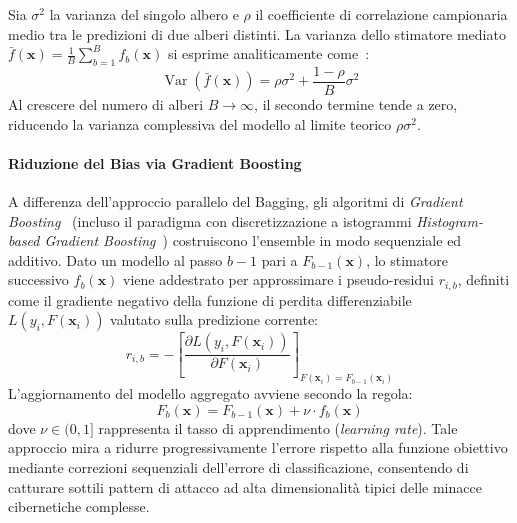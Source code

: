 Sia $\sigma^2$ la varianza del singolo albero e $\rho$ il coefficiente di correlazione campionaria medio tra le predizioni di due alberi distinti. La varianza dello stimatore mediato $\bar{f}(\mathbf{x}) = \frac{1}{B} \sum_{b=1}^B f_b(\mathbf{x})$ si esprime analiticamente come~\cite{hastie2009}:
\begin{equation}
    \operatorname{Var}(\bar{f}(\mathbf{x})) = \rho \sigma^2 + \frac{1 - \rho}{B} \sigma^2
\end{equation}
Al crescere del numero di alberi $B \to \infty$, il secondo termine tende a zero, riducendo la varianza complessiva del modello al limite teorico $\rho \sigma^2$.

\paragraph{Riduzione del Bias via Gradient Boosting}
A differenza dell'approccio parallelo del Bagging, gli algoritmi di \textit{Gradient Boosting}~\cite{friedman2001} (incluso il paradigma con discretizzazione a istogrammi \textit{Histogram-based Gradient Boosting}~\cite{ke2017}) costruiscono l'ensemble in modo sequenziale ed additivo. Dato un modello al passo $b-1$ pari a $F_{b-1}(\mathbf{x})$, lo stimatore successivo $f_b(\mathbf{x})$ viene addestrato per approssimare i pseudo-residui $r_{i,b}$, definiti come il gradiente negativo della funzione di perdita differenziabile $L(y_i, F(\mathbf{x}_i))$ valutato sulla predizione corrente:
\begin{equation}
    r_{i,b} = -\left[ \frac{\partial L(y_i, F(\mathbf{x}_i))}{\partial F(\mathbf{x}_i)} \right]_{F(\mathbf{x}_i) = F_{b-1}(\mathbf{x}_i)}
\end{equation}
L'aggiornamento del modello aggregato avviene secondo la regola:
\begin{equation}
    F_b(\mathbf{x}) = F_{b-1}(\mathbf{x}) + \nu \cdot f_b(\mathbf{x})
\end{equation}
dove $\nu \in (0, 1]$ rappresenta il tasso di apprendimento (\textit{learning rate}). Tale approccio mira a ridurre progressivamente l'errore rispetto alla funzione obiettivo mediante correzioni sequenziali dell'errore di classificazione, consentendo di catturare sottili pattern di attacco ad alta dimensionalità tipici delle minacce cibernetiche complesse.

